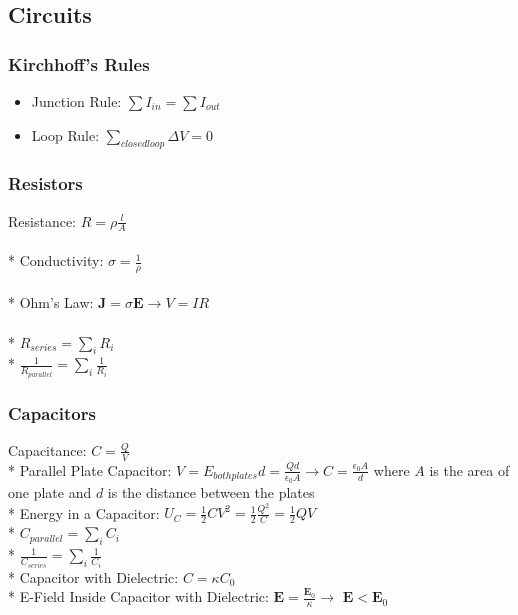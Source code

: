 \subsection{Circuits}

\subsubsection{Kirchhoff's Rules}
\begin{itemize}
\item Junction Rule: \(\displaystyle\sum I_{in}=\sum I_{out}\)
\item Loop Rule: \(\displaystyle\sum_{closed loop}\Delta V=0\)
\end{itemize}

\subsubsection{Resistors}
Resistance: \(\displaystyle R=\rho\frac{l}{A}\)\\\\*
Conductivity: \(\displaystyle\sigma = \frac{1}{\rho}\)\\\\*
Ohm's Law: \(\mathbf{J}=\sigma\mathbf{E}\to V=IR\)\\\\*
\(\displaystyle R_{series}=\sum_i R_i\)\\*
\(\displaystyle\frac{1}{R_{parallel}}=\sum_i \frac{1}{R_i}\)

\subsubsection{Capacitors}
Capacitance: \(\displaystyle C=\frac{Q}{V}\)\\*
Parallel Plate Capacitor: \(V=E_{both plates}d=\displaystyle\frac{Qd}{\epsilon_0 A} \to C=\frac{\epsilon_0 A}{d}\) where \(A\) is the area of one plate and \(d\) is the distance between the plates\\*
Energy in a Capacitor: \(U_C=\frac{1}{2}CV^2=\frac{1}{2}\frac{Q^2}{C}=\frac{1}{2}QV\)\\*
\(\displaystyle C_{parallel}=\sum_i C_i\)\\*
\(\displaystyle\frac{1}{C_{series}}=\sum_i \frac{1}{C_i}\)\\*
Capacitor with Dielectric: \(C=\kappa C_0\)\\*
E-Field Inside Capacitor with Dielectric: \(\displaystyle\mathbf{E}=\frac{\mathbf{E}_0}{\kappa}\to\) \(\mathbf{E}<\mathbf{E}_0\)

